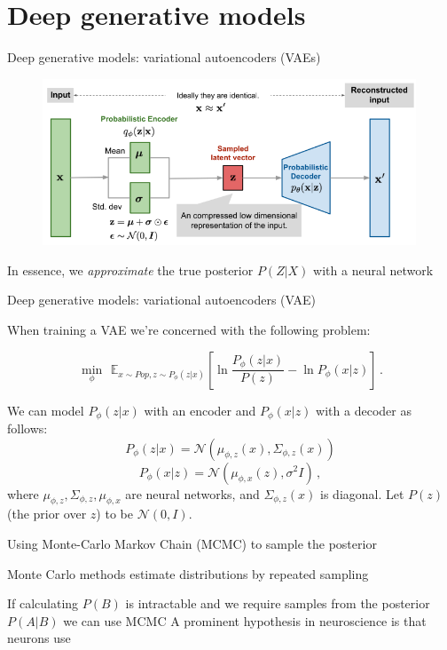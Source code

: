 \documentclass[aspectratio=169]{beamer}
\begin{document}
\section{Deep generative models}
\begin{frame}{Deep generative models: variational autoencoders (VAEs)}

\begin{figure}
\includegraphics[width=135mm]{vae-diagram}
\end{figure}

In essence, we \emph{approximate} the true posterior $P(Z|X)$ with a neural network

\end{frame}

\begin{frame}{Deep generative models: variational autoencoders (VAE)}

When training a VAE we're concerned with the following problem:

$$\min_{\phi} \,\ \mathbb E_{x \sim Pop, z \sim P_\phi(z|x)} \left[ \ln \frac{P_\phi(z|x)}{P(z)} - \ln P_\phi(x|z) \right] \,.$$

We can model $P_\phi(z|x)$ with an encoder and $P_\phi(x|z)$ with a decoder as follows:
$$P_\phi(z|x) = \mathcal N \left(\mu_{\phi,z}(x), \Sigma_{\phi,z}(x) \right)$$
$$P_\phi(x|z) = \mathcal N \left( \mu_{\phi,x}(z), \sigma^2 I \right) \,,$$
where $\mu_{\phi,z}, \Sigma_{\phi,z}, \mu_{\phi,x}$ are neural networks, and $\Sigma_{\phi,z}(x)$ is diagonal.
\vfill
Let $P(z)$ (the prior over $z$) to be $\mathcal N(0, I)$.


\end{frame}

\begin{frame}{Using Monte-Carlo Markov Chain (MCMC) to sample the posterior}

Monte Carlo methods estimate distributions by repeated sampling

\vfill
If calculating $P(B)$ is intractable and we require samples from the posterior $P(A|B )$ we can use MCMC
\vfill
A prominent hypothesis in neuroscience is that neurons use 

\end{frame}
\end{document}
